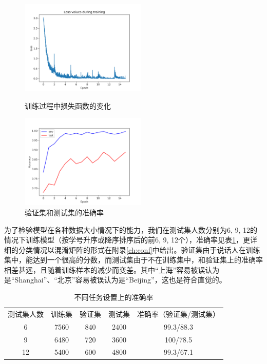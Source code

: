 \documentclass[12pt]{article} %
\begin{document}
\begin{figure}[ht]
\centering
\begin{minipage}[t]{0.48\textwidth}
\centering
\includegraphics[width=6cm]{loss.png}
\caption{训练过程中损失函数的变化}
\label{fig:loss}
\end{minipage}
\begin{minipage}[t]{0.48\textwidth}
\centering
\includegraphics[width=6cm]{devtest.png}
\caption{验证集和测试集的准确率}
\label{fig:devtest}
\end{minipage}
\end{figure}

为了检验模型在各种数据大小情况下的能力，我们在测试集人数分别为6, 9, 12的情况下训练模型（按学号升序或降序排序后的前6, 9, 12个），准确率见表\ref{tb:setup}，更详细的分类情况以混淆矩阵的形式在附录\ref{ch:conf}中给出。验证集由于说话人在训练集中，能达到一个很高的分数，而测试集由于不在训练集中，和验证集上的准确率相差甚远，且随着训练样本的减少而变差。其中“上海”容易被误认为是“Shanghai”、“北京”容易被误认为是“Beijing”，这也是符合直觉的。


\begin{table}[ht]
\caption{不同任务设置上的准确率}
\label{tb:setup}
\centering
\begin{tabular}{ccccc}
\hline
测试集人数 & 训练集 & 验证集 & 测试集 & 准确率（验证集/测试集） \\ 
6 & 7560 & 840 & 2400 & 99.3/88.3 \\
9 & 6480 & 720 & 3600 & 100/78.5 \\
12 & 5400 & 600 & 4800 & 99.3/67.1 \\
\hline
\end{tabular} 
\end{table}
\end{document}
